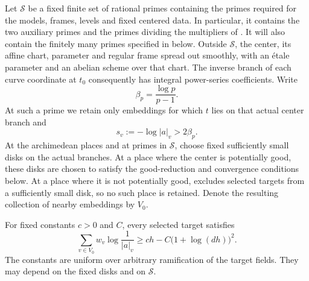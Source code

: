 Let $\mathcal S$ be a fixed finite set of rational primes containing the
primes required for the models, frames, levels and fixed centered data.
In particular, it contains the two auxiliary primes and the primes
dividing the multipliers of .  It will also contain
the finitely many primes specified in  below.
Outside $\mathcal S$, the center, its affine chart, parameter and
regular frame spread out smoothly, with an \'etale parameter and an
abelian scheme over that chart.  The inverse branch of each curve
coordinate at $t_0$ consequently has integral power-series
coefficients.  Write
\[
 \beta_p=\frac{\log p}{p-1}.
\]
At such a prime we retain only embeddings for which $t$ lies on that
actual center branch and
\begin{equation}\label{loc:radius}
 s_v:=-\log|a|_v>2\beta_p.
\end{equation}
At the archimedean places and at primes in $\mathcal S$, choose fixed
sufficiently small disks on the actual branches.  At a place where the
center is potentially good, these disks are chosen to satisfy the
good-reduction and convergence conditions below.  At a place where it
is not potentially good,  excludes selected targets
from a sufficiently small disk, so no such place is retained.  Denote
the resulting collection of nearby embeddings by $V_0$.

\begin{lemma}\label{loc:mass}
For fixed constants $c>0$ and $C$, every selected target satisfies
\begin{equation}\label{loc:mass-estimate}
 \sum_{v\in V_0}w_v\log\frac1{|a|_v}
 \geq c h-C\bigl(1+\log(dh)\bigr)^2.
\end{equation}
The constants are uniform over arbitrary ramification of the target
fields.  They may depend on the fixed disks and on $\mathcal S$.
\end{lemma}

